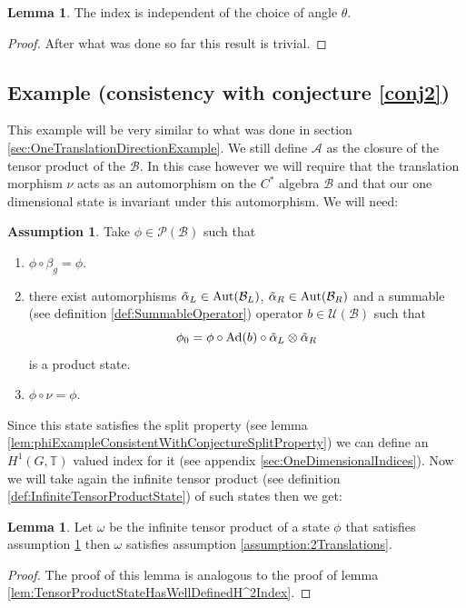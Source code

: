 \documentclass[12pt,a4paper,twoside]{article}
\let\originalleft\left
\let\originalright\right
\renewcommand{\left}{\mathopen{}\mathclose\bgroup\originalleft}
\renewcommand{\right}{\aftergroup\egroup\originalright}
\newcommand{\UU}{\mathcal U}
\newcommand{\BB}{\mathcal B}
\newcommand{\PP}{\mathcal P}
\newcommand{\TT}{\mathbb T}
\renewcommand{\AA}{\mathcal A}
\newcommand{\Ad}[1]{\textrm{Ad}\left(#1\right)}
\newcommand{\Aut}[1]{\textrm{Aut}\left(#1\right)}
\theoremstyle{definition}
\newtheorem{lemma}[theorem]{Lemma}
\newtheorem{assumption}[theorem]{Assumption}
\numberwithin{equation}{section}
\begin{document}
\begin{lemma}
	The index is independent of the choice of angle $\theta$.
\end{lemma}
\begin{proof}
	After what was done so far this result is trivial.
\end{proof}
\subsection{Example (consistency with conjecture \ref{conj2})}\label{sec:TwoTranslationDirectionsExample}
This example will be very similar to what was done in section \ref{sec:OneTranslationDirectionExample}. We still define $\AA$ as the closure of the tensor product of the $\BB$. In this case however we will require that the translation morphism $\nu$ acts as an automorphism on the $C^*$ algebra $\BB$ and that our one dimensional state is invariant under this automorphism. We will need:
\begin{assumption}\label{assumption1dWithTranslation}
	Take $\phi\in\PP(\BB)$ such that
	\begin{enumerate}
		\item $\phi\circ\beta_g=\phi$.
		\item there exist automorphisms $\tilde\alpha_L\in\Aut{\BB_L}$, $\tilde\alpha_R\in\Aut{\BB_R}$ and a summable (see definition \ref{def:SummableOperator}) operator $b\in\UU(\BB)$ such that
		\begin{equation}
			\phi_0=\phi\circ\Ad{b}\circ\tilde\alpha_L\otimes\tilde\alpha_R
		\end{equation}
		is a product state.
		\item $\phi\circ\nu=\phi$.
	\end{enumerate}
\end{assumption}
Since this state satisfies the split property (see lemma \ref{lem:phiExampleConsistentWithConjectureSplitProperty}) we can define an $H^1(G,\TT)$ valued index for it (see appendix \ref{sec:OneDimensionalIndices}). Now we will take again the infinite tensor product (see definition \ref{def:InfiniteTensorProductState}) of such states then we get:
\begin{lemma}
	Let $\omega$ be the infinite tensor product of a state $\phi$ that satisfies assumption \ref{assumption1dWithTranslation} then $\omega$ satisfies assumption \ref{assumption:2Translations}.
\end{lemma}
\begin{proof}
	The proof of this lemma is analogous to the proof of lemma \ref{lem:TensorProductStateHasWellDefinedH^2Index}.
\end{proof}
\end{document}
